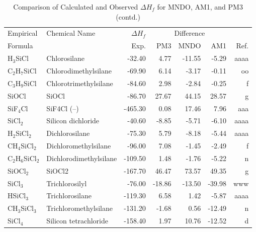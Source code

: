 \begin{table}
\caption{Comparison of Calculated and Observed $\Delta H_f$ 
for MNDO, AM1, and PM3 (contd.)}
\begin{center}
\compresstable
\begin{tabular}{llrrrrr}
Empirical & Chemical Name & $\Delta H_f$ & \multicolumn{3}{c}{Difference} & \\
Formula   &               & Exp. & PM3 &  MNDO  &  AM1 &     Ref.\\
\hline
 H$_3$SiCl      & Chlorosilane                           &   -32.40    &     4.77  &   -11.55  &    -5.29  &   aaaa\\
 C$_2$H$_7$SiCl    & Chlorodimethylsilane                   &   -69.90    &     6.14  &    -3.17  &    -0.11  &     oo\\
 C$_3$H$_9$SiCl    & Chlorotrimethylsilane                  &   -84.60    &     2.98  &    -2.84  &    -0.25  &      f\\
 SiOCl       & SiOCl                                  &   -86.70    &    27.67  &    44.15  &    28.57  &      g\\
 SiF$_4$Cl      & SiF4Cl (--)                             &  -465.30    &     0.08  &    17.46  &     7.96  &    aaa\\
 SiCl$_2$       & Silicon dichloride                     &   -40.60    &    -8.85  &    -5.71  &    -6.10  &   aaaa\\
 H$_2$SiCl$_2$     & Dichlorosilane                         &   -75.30    &     5.79  &    -8.18  &    -5.44  &   aaaa\\
 CH$_4$SiCl$_2$    & Dichloromethylsilane                   &   -96.00    &     7.08  &    -1.45  &    -2.49  &      f\\
 C$_2$H$_6$SiCl$_2$   & Dichlorodimethylsilane                 &  -109.50    &     1.48  &    -1.76  &    -5.22  &      n\\
 SiOCl$_2$      & SiOCl2                                 &  -167.70    &    46.47  &    73.57  &    49.35  &      g\\
 SiCl$_3$       & Trichlorosilyl                         &   -76.00    &   -18.86  &   -13.50  &   -39.98  &    www\\
 HSiCl$_3$      & Trichlorosilane                        &  -119.30    &     6.58  &     1.42  &    -5.87  &   aaaa\\
 CH$_3$SiCl$_3$    & Trichloromethylsilane                  &  -131.20    &    -1.68  &     0.56  &   -12.49  &      n\\
 SiCl$_4$       & Silicon tetrachloride                  &  -158.40    &     1.97  &    10.76  &   -12.52  &      d\\

\end{tabular}
\end{center}
\end{table}
